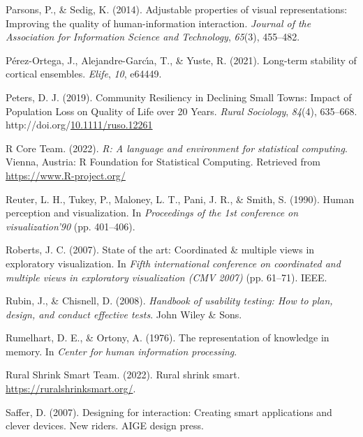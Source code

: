 \documentclass[print]{nuthesis}
\newlength{\cslhangindent}
\newenvironment{CSLReferences}[2]%
{\setlength{\parindent}{0pt}%
\everypar{\setlength{\hangindent}{\cslhangindent}}\ignorespaces}%
{\par}
\begin{document}
\begin{CSLReferences}{1}{0}
\leavevmode{}%
Parsons, P., \& Sedig, K. (2014). Adjustable properties of visual representations: Improving the quality of human-information interaction. \emph{Journal of the Association for Information Science and Technology}, \emph{65}(3), 455--482.

\leavevmode{}%
Pérez-Ortega, J., Alejandre-Garcı́a, T., \& Yuste, R. (2021). Long-term stability of cortical ensembles. \emph{Elife}, \emph{10}, e64449.

\leavevmode{}%
Peters, D. J. (2019). Community {Resiliency} in {Declining} {Small} {Towns}: {Impact} of {Population} {Loss} on {Quality} of {Life} over 20 {Years}. \emph{Rural Sociology}, \emph{84}(4), 635--668. http://doi.org/\href{https://doi.org/10.1111/ruso.12261}{10.1111/ruso.12261}

\leavevmode{}%
R Core Team. (2022). \emph{R: A language and environment for statistical computing}. Vienna, Austria: R Foundation for Statistical Computing. Retrieved from \url{https://www.R-project.org/}

\leavevmode{}%
Reuter, L. H., Tukey, P., Maloney, L. T., Pani, J. R., \& Smith, S. (1990). Human perception and visualization. In \emph{Proceedings of the 1st conference on visualization'90} (pp. 401--406).

\leavevmode{}%
Roberts, J. C. (2007). State of the art: Coordinated \& multiple views in exploratory visualization. In \emph{Fifth international conference on coordinated and multiple views in exploratory visualization (CMV 2007)} (pp. 61--71). IEEE.

\leavevmode{}%
Rubin, J., \& Chisnell, D. (2008). \emph{Handbook of usability testing: How to plan, design, and conduct effective tests}. John Wiley \& Sons.

\leavevmode{}%
Rumelhart, D. E., \& Ortony, A. (1976). The representation of knowledge in memory. In \emph{Center for human information processing}.

\leavevmode{}%
Rural Shrink Smart Team. (2022). Rural shrink smart. \url{https://ruralshrinksmart.org/}.

\leavevmode{}%
Saffer, D. (2007). Designing for interaction: Creating smart applications and clever devices. New riders. AIGE design press.


\end{CSLReferences}
\end{document}
